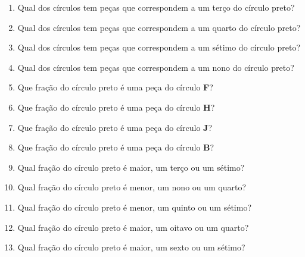 \begin{atividade}{}



\begin{enumerate}
  \item  Qual dos círculos tem peças que correspondem a um terço do círculo pre\-to?
  \item  Qual dos círculos tem peças que correspondem a  um quarto do círculo preto?
  \item  Qual dos círculos tem peças que correspondem a um sétimo do círculo preto?
  \item  Qual dos círculos tem peças que correspondem a  um nono do círculo pre\-to?
  \item  Que fração do círculo preto é uma peça do círculo \textbf{F}?
  \item  Que fração do círculo preto é uma peça do círculo \textbf{H}?
  \item  Que fração do círculo preto é uma peça do círculo \textbf{J}?
  \item  Que fração do círculo preto é uma peça do círculo \textbf{B}?
  \item  Qual fração do círculo preto é maior, um terço ou um sétimo?
  \item  Qual fração do círculo preto é menor, um nono ou um quarto? 
  \item  Qual fração do círculo preto é menor, um quinto ou um sétimo?
  \item  Qual fração do círculo preto é maior, um oitavo ou um quarto?
  \item  Qual fração do círculo preto é maior, um sexto ou um sétimo?
\end{enumerate}
\end{atividade}
